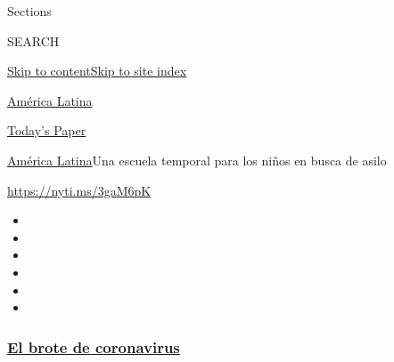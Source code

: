 Sections

SEARCH

\protect\hyperlink{site-content}{Skip to
content}\protect\hyperlink{site-index}{Skip to site index}

\href{https://www.nytimes3xbfgragh.onion/es/section/america-latina}{América
Latina}

\href{https://myaccount.nytimes3xbfgragh.onion/auth/login?response_type=cookie\&client_id=vi}{}

\href{https://www.nytimes3xbfgragh.onion/section/todayspaper}{Today's
Paper}

\href{/es/section/america-latina}{América Latina}\textbar{}Una escuela
temporal para los niños en busca de asilo

\url{https://nyti.ms/3gaM6pK}

\begin{itemize}
\item
\item
\item
\item
\item
\item
\end{itemize}

\hypertarget{el-brote-de-coronavirus}{%
\subsubsection{\texorpdfstring{\href{https://www.nytimes3xbfgragh.onion/es/spotlight/coronavirus?name=styln-coronavirus-es\&region=TOP_BANNER\&block=storyline_menu_recirc\&action=click\&pgtype=Article\&impression_id=ab230980-f4cb-11ea-9a82-8ff3d0b97313\&variant=undefined}{El
brote de
coronavirus}}{El brote de coronavirus}}\label{el-brote-de-coronavirus}}

